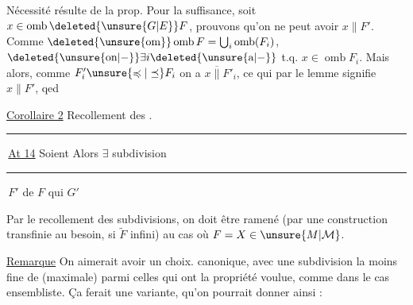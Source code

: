 Nécessité résulte de la prop. Pour la suffisance, soit $x\in\operatorname{omb}\deleted{\unsure{G|E}}F$, prouvons qu'on ne peut avoir $x\parallel F'$. Comme $\deleted{\unsure{\operatorname{om}}}\operatorname{omb}F=\bigcup_i\operatorname{omb}(F_i)$, $\deleted{\unsure{\text{on}|{-}}}\exists i\deleted{\unsure{\text{a}|{-}}}$ t.q. $x\in\operatorname{omb}F_i$. Mais alors, comme $F'_i\unsure{\preccurlyeq|\preceq}F_i$ on a $x\mathrel{\overline{\parallel}}F'_i$, ce qui par le lemme signifie $x\parallel F'$, qed

\uline{Corollaire 2} \quad Recollement des .

\rule[-.4ex]{.4pt}{2.4ex}\,\uline{At 14} \quad Soient
Alors $\exists$ subdivision \rule[-.4ex]{.4pt}{2.4ex}\,$F'$ de $F$ qui  $G'$

Par le recollement des subdivisions, on doit être ramené (par une construction transfinie au besoin, si $\widetilde F$ infini) au cas où $F=X\in\unsure{M|\mathcal M}$.

\uline{Remarque} \quad On aimerait avoir un choix. canonique, avec une subdivision  la moins fine de  (maximale) parmi celles qui ont la propriété voulue, comme dans le cas ensembliste. Ça ferait une variante, qu'on pourrait donner ainsi :
